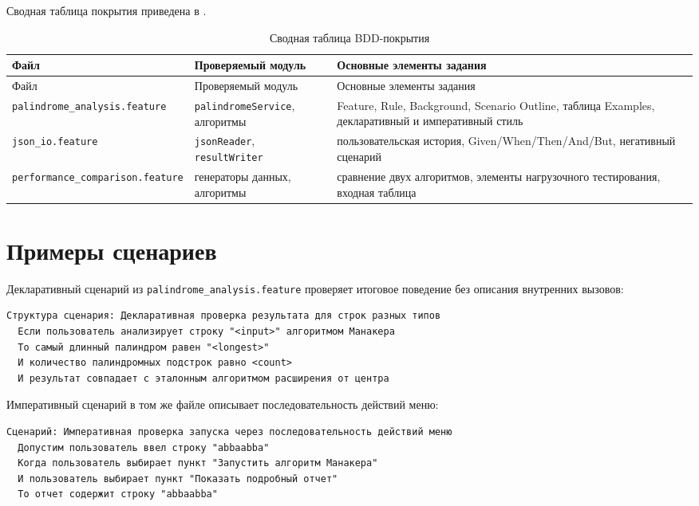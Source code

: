 Сводная таблица покрытия приведена в .

\noindent
\begingroup
\centering
\small
\begin{longtable}[c]{|p{4.2cm}|p{4.3cm}|p{6.3cm}|}
    \caption{Сводная таблица BDD-покрытия}
    \label{tab:bdd-coverage}
    \\
    \hline
    Файл & Проверяемый модуль & Основные элементы задания \\ \hline
    \endfirsthead
    \hline
    Файл & Проверяемый модуль & Основные элементы задания \\ \hline
    \endhead
    \hline
    \endfoot
    \texttt{palindrome\_analysis.feature} & \texttt{palindromeService}, алгоритмы & Feature, Rule, Background, Scenario Outline, таблица Examples, декларативный и императивный стиль \\ \hline
    \texttt{json\_io.feature} & \texttt{jsonReader}, \texttt{resultWriter} & пользовательская история, Given/When/Then/And/But, негативный сценарий \\ \hline
    \texttt{performance\_comparison.feature} & генераторы данных, алгоритмы & сравнение двух алгоритмов, элементы нагрузочного тестирования, входная таблица \\ \hline
\end{longtable}
\normalsize
\endgroup

\section{Примеры сценариев} \label{ch1:sec4}

Декларативный сценарий из \texttt{palindrome\_analysis.feature} проверяет итоговое поведение без описания внутренних вызовов:

\begin{lstlisting}[breaklines=true]
Структура сценария: Декларативная проверка результата для строк разных типов
  Если пользователь анализирует строку "<input>" алгоритмом Манакера
  То самый длинный палиндром равен "<longest>"
  И количество палиндромных подстрок равно <count>
  И результат совпадает с эталонным алгоритмом расширения от центра
\end{lstlisting}

Императивный сценарий в том же файле описывает последовательность действий меню:

\begin{lstlisting}[breaklines=true]
Сценарий: Императивная проверка запуска через последовательность действий меню
  Допустим пользователь ввел строку "abbaabba"
  Когда пользователь выбирает пункт "Запустить алгоритм Манакера"
  И пользователь выбирает пункт "Показать подробный отчет"
  То отчет содержит строку "abbaabba"
\end{lstlisting}

